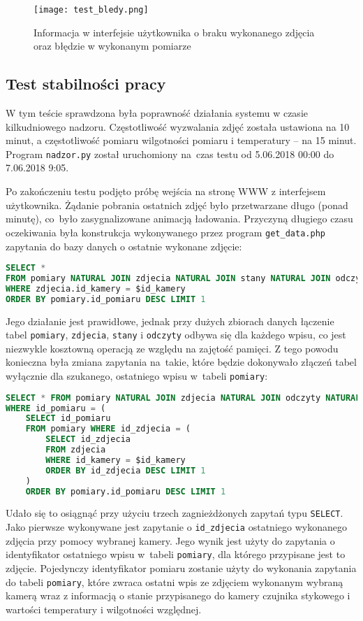 \documentclass[a4paper,11pt,twoside]{article}
\begin{document}
\begin{figure}[H]
\begin{center}
\texttt{[image: test\_bledy.png]}
\caption{Informacja w interfejsie użytkownika o braku wykonanego zdjęcia oraz błędzie w wykonanym pomiarze}
\label{fig: test_bledy}
\end{center}
\end{figure}

\subsection{Test stabilności pracy}
W tym teście sprawdzona była poprawność działania systemu w czasie kilkudniowego nadzoru. Częstotliwość wyzwalania zdjęć została ustawiona na 10 minut, a częstotliwość pomiaru wilgotności pomiaru i temperatury -- na 15 minut. Program \texttt{nadzor.py} został uruchomiony na~czas testu od 5.06.2018 00:00 do 7.06.2018 9:05.

Po zakończeniu testu podjęto próbę wejścia na stronę WWW z interfejsem użytkownika. Żądanie pobrania ostatnich zdjęć było przetwarzane długo (ponad minutę), co~było zasygnalizowane animacją ładowania. Przyczyną długiego czasu oczekiwania była konstrukcja wykonywanego przez program \texttt{get{\_}data.php} zapytania do bazy danych o ostatnie wykonane zdjęcie:
\begin{lstlisting}[language=SQL]
SELECT *
FROM pomiary NATURAL JOIN zdjecia NATURAL JOIN stany NATURAL JOIN odczyty
WHERE zdjecia.id_kamery = $id_kamery  
ORDER BY pomiary.id_pomiaru DESC LIMIT 1
\end{lstlisting}
Jego działanie jest prawidłowe, jednak przy dużych zbiorach danych łączenie tabel \texttt{pomiary}, \texttt{zdjecia}, \texttt{stany} i \texttt{odczyty} odbywa się dla każdego wpisu, co jest niezwykle kosztowną operacją ze względu na zajętość pamięci. Z tego powodu konieczna była zmiana zapytania na~takie, które będzie dokonywało złączeń tabel wyłącznie dla szukanego, ostatniego wpisu w~tabeli \texttt{pomiary}:
\begin{lstlisting}[language=SQL]
SELECT * FROM pomiary NATURAL JOIN zdjecia NATURAL JOIN odczyty NATURAL JOIN stany
WHERE id_pomiaru = (
	SELECT id_pomiaru 
	FROM pomiary WHERE id_zdjecia = (
		SELECT id_zdjecia 
		FROM zdjecia 
		WHERE id_kamery = $id_kamery 
		ORDER BY id_zdjecia DESC LIMIT 1
	)
	ORDER BY pomiary.id_pomiaru DESC LIMIT 1
\end{lstlisting}
Udało się to osiągnąć przy użyciu trzech zagnieżdżonych zapytań typu \texttt{SELECT}. Jako pierwsze wykonywane jest zapytanie o \texttt{id{\_}zdjecia} ostatniego wykonanego zdjęcia przy pomocy wybranej kamery. Jego wynik jest użyty do zapytania o identyfikator ostatniego wpisu w~tabeli \texttt{pomiary}, dla którego przypisane jest to zdjęcie. Pojedynczy identyfikator pomiaru zostanie użyty do wykonania zapytania do tabeli \texttt{pomiary}, które zwraca ostatni wpis ze zdjęciem wykonanym wybraną kamerą wraz z informacją o stanie przypisanego do kamery czujnika stykowego i wartości temperatury i wilgotności względnej. 
\end{document}
